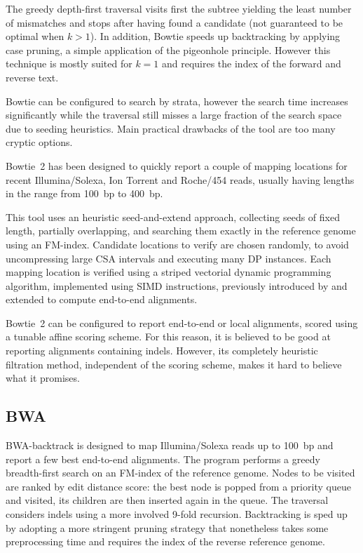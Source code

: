 The greedy depth-first traversal visits first the subtree yielding the least number of mismatches and stops after having found a candidate (not guaranteed to be optimal when $k>1$).
In addition, Bowtie speeds up backtracking by applying case pruning, a simple application of the pigeonhole principle.
However this technique is mostly suited for $k=1$ and requires the index of the forward and reverse text.

Bowtie can be configured to search by strata, however the search time increases significantly while the traversal still misses a large fraction of the search space due to seeding heuristics.
Main practical drawbacks of the tool are too many cryptic options.

Bowtie~2 \citep{Bowtie2} has been designed to quickly report a couple of mapping locations for recent Illumina/Solexa, Ion Torrent and Roche/454 reads, usually having lengths in the range from 100~bp to 400~bp.

This tool uses an heuristic seed-and-extend approach, collecting seeds of fixed length, partially overlapping, and searching them exactly in the reference genome using an FM-index.
Candidate locations to verify are chosen randomly, to avoid uncompressing large CSA intervals and executing many DP instances.
Each mapping location is verified using a striped vectorial dynamic programming algorithm, implemented using SIMD instructions, previously introduced by \citep{Farrar2007} and extended to compute end-to-end alignments.

Bowtie~2 can be configured to report end-to-end or local alignments, scored using a tunable affine scoring scheme.
For this reason, it is believed to be good at reporting alignments containing indels.
However, its completely heuristic filtration method, independent of the scoring scheme, makes it hard to believe what it promises.


\subsection{BWA}

BWA-backtrack \citep{BWA} is designed to map Illumina/Solexa reads up to 100~bp and report a few best end-to-end alignments.
The program performs a greedy breadth-first search on an FM-index of the reference genome.
Nodes to be visited are ranked by edit distance score: the best node is popped from a priority queue and visited, its children are then inserted again in the queue.
The traversal considers indels using a more involved 9-fold recursion.
Backtracking is sped up by adopting a more stringent pruning strategy that nonetheless takes some preprocessing time and requires the index of the reverse reference genome.

